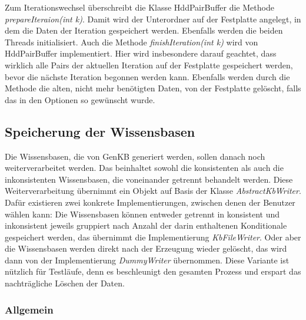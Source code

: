 \documentclass[12pt,a4paper]{article}
\begin{document}
Zum Iterationswechsel überschreibt die Klasse HddPairBuffer die Methode \textit{prepareIteraion(int k)}. Damit wird der Unterordner auf der Festplatte angelegt, in dem die Daten der Iteration gespeichert werden. Ebenfalls werden die beiden Threads initialisiert. Auch die Methode \textit{finishIteration(int k)} wird von HddPairBuffer implementiert. Hier wird insbesondere darauf geachtet, dass wirklich alle Pairs der aktuellen Iteration auf der Festplatte gespeichert werden, bevor die nächste Iteration begonnen werden kann. Ebenfalls werden durch die Methode die alten, nicht mehr benötigten Daten, von der Festplatte gelöscht, falls das in den Optionen so gewünscht wurde.



\subsection{Speicherung der Wissensbasen}
Die Wissensbasen, die von GenKB generiert werden, sollen danach noch weiterverarbeitet werden. Das beinhaltet sowohl die konsistenten als auch die inkonsistenten Wissensbasen, die voneinander getrennt behandelt werden. Diese Weiterverarbeitung übernimmt ein Objekt auf Basis der Klasse \textit{AbstractKbWriter}. Dafür existieren zwei konkrete Implementierungen, zwischen denen der Benutzer wählen kann: Die Wissensbasen können entweder getrennt in konsistent und inkonsistent jeweils gruppiert nach Anzahl der darin enthaltenen Konditionale gespeichert werden, das übernimmt die Implementierung \textit{KbFileWriter}. Oder aber die Wissensbasen werden direkt nach der Erzeugung wieder gelöscht, das wird dann von der Implementierung \textit{DummyWriter} übernommen. Diese Variante ist nützlich für Testläufe, denn es beschleunigt den gesamten Prozess und erspart das nachträgliche Löschen der Daten.
\subsubsection{Allgemein}
\end{document}
